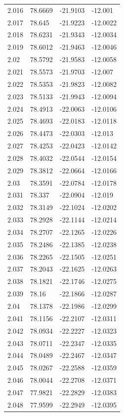 \begin{tabular}{llll}
2.016 & 78.6669 & -21.9103 & -12.001 \\
2.017 & 78.645 & -21.9223 & -12.0022 \\
2.018 & 78.6231 & -21.9343 & -12.0034 \\
2.019 & 78.6012 & -21.9463 & -12.0046 \\
2.02 & 78.5792 & -21.9583 & -12.0058 \\
2.021 & 78.5573 & -21.9703 & -12.007 \\
2.022 & 78.5353 & -21.9823 & -12.0082 \\
2.023 & 78.5133 & -21.9943 & -12.0094 \\
2.024 & 78.4913 & -22.0063 & -12.0106 \\
2.025 & 78.4693 & -22.0183 & -12.0118 \\
2.026 & 78.4473 & -22.0303 & -12.013 \\
2.027 & 78.4253 & -22.0423 & -12.0142 \\
2.028 & 78.4032 & -22.0544 & -12.0154 \\
2.029 & 78.3812 & -22.0664 & -12.0166 \\
2.03 & 78.3591 & -22.0784 & -12.0178 \\
2.031 & 78.337 & -22.0904 & -12.019 \\
2.032 & 78.3149 & -22.1024 & -12.0202 \\
2.033 & 78.2928 & -22.1144 & -12.0214 \\
2.034 & 78.2707 & -22.1265 & -12.0226 \\
2.035 & 78.2486 & -22.1385 & -12.0238 \\
2.036 & 78.2265 & -22.1505 & -12.0251 \\
2.037 & 78.2043 & -22.1625 & -12.0263 \\
2.038 & 78.1821 & -22.1746 & -12.0275 \\
2.039 & 78.16 & -22.1866 & -12.0287 \\
2.04 & 78.1378 & -22.1986 & -12.0299 \\
2.041 & 78.1156 & -22.2107 & -12.0311 \\
2.042 & 78.0934 & -22.2227 & -12.0323 \\
2.043 & 78.0711 & -22.2347 & -12.0335 \\
2.044 & 78.0489 & -22.2467 & -12.0347 \\
2.045 & 78.0267 & -22.2588 & -12.0359 \\
2.046 & 78.0044 & -22.2708 & -12.0371 \\
2.047 & 77.9821 & -22.2829 & -12.0383 \\
2.048 & 77.9599 & -22.2949 & -12.0395 \\

\end{tabular}
